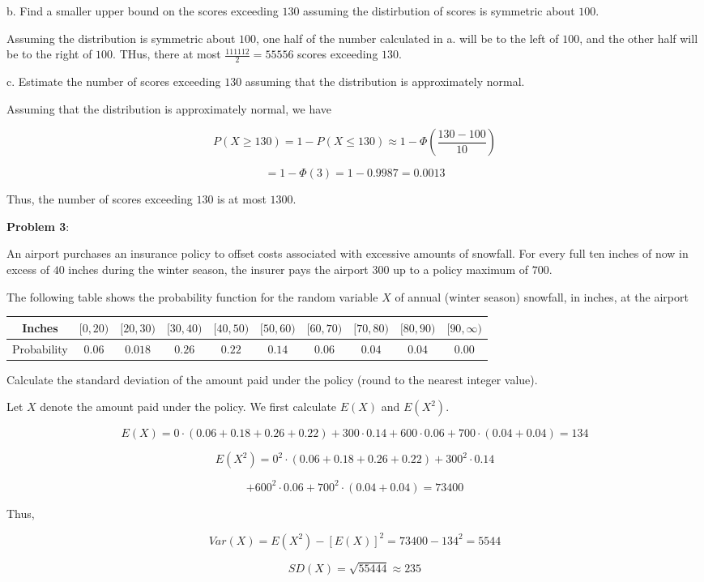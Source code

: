 \documentclass{article}
\begin{document}
\indent\indent b. Find a smaller upper bound on the scores exceeding $130$ assuming the distirbution of scores is symmetric about $100$.

{\color{blue}

Assuming the distribution is symmetric about $100$, one half of the number calculated in a. will be to the left of $100$, and the other half will be to the right of $100$. THus, there at most $\frac{111112}{2}=55556$ scores exceeding $130$.

}

\indent\indent c. Estimate the number of scores exceeding $130$ assuming that the distribution is approximately normal.

{\color{blue}

Assuming that the distribution is approximately normal, we have

$$P(X\ge130)=1-P(X\le130)\approx1-\Phi(\frac{130-100}{10})$$

$$=1-\Phi(3)=1-0.9987=0.0013$$

Thus, the number of scores exceeding $130$ is at most $1300$.

}

\noindent\textbf{Problem 3}:

An airport purchases an insurance policy to offset costs associated with excessive amounts of snowfall. For every full ten inches of now in excess of $40$ inches during the winter season, the insurer pays the airport $300$ up to a policy maximum of $700$.

The following table shows the probability function for the random variable $X$ of annual (winter season) snowfall, in inches, at the airport

\begin{center}
    \begin{tabular}{ |c|c|c|c|c|c|c|c|c|c|}
        \hline
        Inches&$[0,20)$&$[20,30)$&$[30,40)$&$[40,50)$&$[50,60)$&$[60,70)$&$[70,80)$&$[80,90)$&$[90,\infty)$\\
        \hline
        Probability&$0.06$&$0.018$&$0.26$&$0.22$&$0.14$&$0.06$&$0.04$&$0.04$&$0.00$\\
        \hline
    \end{tabular}
\end{center}

Calculate the standard deviation of the amount paid under the policy (round to the nearest integer value).

{\color{blue}

Let $X$ denote the amount paid under the policy. We first calculate $E(X)$ and $E(X^2)$.

$$E(X)=0\cdot(0.06+0.18+0.26+0.22)+300\cdot0.14+600\cdot0.06+700\cdot(0.04+0.04)=134$$

$$E(X^2)=0^2\cdot(0.06+0.18+0.26+0.22)+300^2\cdot0.14$$

$$+600^2\cdot0.06+700^2\cdot(0.04+0.04)=73400$$

Thus,

$$Var(X)=E(X^2)-[E(X)]^2=73400-134^2=5544$$

$$SD(X)=\sqrt{55444}\approx235$$

}
\end{document}
